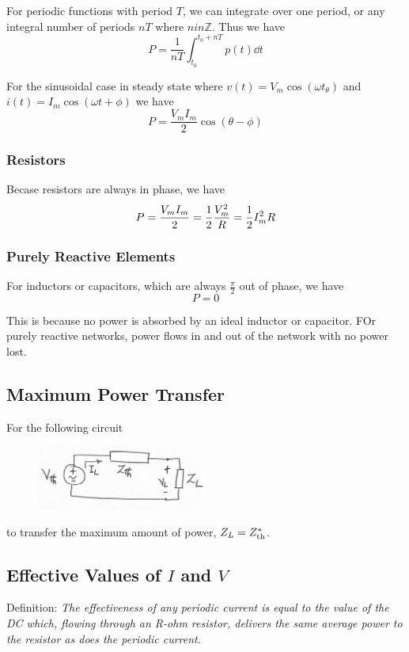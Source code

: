 \documentclass[12pt]{article}
\begin{document}
For periodic functions with period $T$, we can integrate over one period, or any integral number of periods $nT$ where $n in \mathbb{Z}$. Thus we have \[ P = \frac{1}{nT} \int_{t_0}^{t_0+nT} p(t) \dd t \]

For the sinusoidal case in steady state where $v(t) = V_m\cos(\omega t _ \theta)$ and $i(t) = I_m\cos(\omega t + \phi)$ we have \[ P = \frac{V_mI_m}{2}\cos(\theta - \phi) \]

\subsubsection*{Resistors}
Becase resistors are always in phase, we have \[ P = \frac{V_mI_m}{2} = \frac{1}{2} \frac{V_m^2}{R} = \frac{1}{2} I_m^2R \]

\subsubsection*{Purely Reactive Elements}
For inductors or capacitors, which are always $\frac{\pi}{2}$ out of phase, we have \[ P = 0 \]

This is because no power is absorbed by an ideal inductor or capacitor. FOr purely reactive networks, power flows in and out of the network with no power lost.

\newpage
\subsection*{Maximum Power Transfer}
For the following circuit
\begin{figure}[ht]
\centering
\includegraphics[width=0.5\textwidth]{impedance.png}
\end{figure}

to transfer the maximum amount of power, $Z_L = Z_{{\rm th}}^*$.

\subsection*{Effective Values of $I$ and $V$}
Definition: \textit{The effectiveness of any periodic current is equal to the value of the DC which, flowing through an R-ohm resistor, delivers the same average power to the resistor as does the periodic current.}
\end{document}

